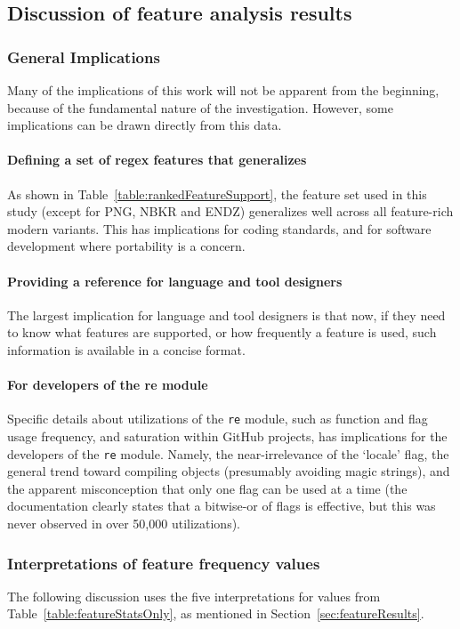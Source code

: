\subsection{Discussion of feature analysis results}
\label{sec:featureDiscussion}

\subsubsection{General Implications}
Many of the implications of this work will not be apparent from the beginning, because of the fundamental nature of the investigation.  However, some implications can be drawn directly from this data.

\paragraph{Defining a set of regex features that generalizes} As shown in Table~\ref{table:rankedFeatureSupport}, the feature set used in this study (except for PNG, NBKR and ENDZ) generalizes well across all feature-rich modern variants.  This has implications for coding standards, and for software development where portability is a concern.

\paragraph{Providing a reference for language and tool designers} The largest implication for language and tool designers is that now, if they need to know what features are supported, or how frequently a feature is used, such information is available in a concise format.

\paragraph{For developers of the re module} Specific details about utilizations of the {\tt re} module, such as function and flag usage frequency, and saturation within GitHub projects, has implications for the developers of the {\tt re} module.  Namely, the near-irrelevance of the `locale' flag, the general trend toward compiling objects (presumably avoiding magic strings), and the apparent misconception that only one flag can be used at a time (the documentation clearly states that a bitwise-or of flags is effective, but this was never observed in over 50,000 utilizations).

\subsubsection{Interpretations of feature frequency values}
The following discussion uses the five interpretations for values from Table~\ref{table:featureStatsOnly}, as mentioned in Section~\ref{sec:featureResults}.

